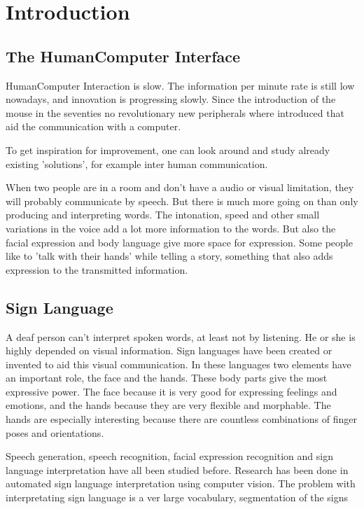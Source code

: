
\chapter{Introduction}
\label{ch:intro}

\section{The Human\-Computer Interface}


Human\-Computer Interaction is slow. The information per minute rate is still low nowadays, and innovation is progressing slowly. Since the introduction of the mouse in the seventies no revolutionary new peripherals where introduced that aid the communication with a computer. 

To get inspiration for improvement, one can look around and study already existing 'solutions', for example inter human communication. 

When two people are in a room and don't have a audio or visual limitation, they will probably communicate by speech. But there is much more going on than only producing and interpreting words. The intonation, speed and other small variations in the voice add a lot more information to the words. But also the facial expression and body language give more space for expression. Some people like to 'talk with their hands' while telling a story, something that also adds expression to the transmitted information.


\section{Sign Language}

A deaf person can't interpret spoken words, at least not by listening. He or she is highly depended on visual information. Sign languages have been created or invented to aid this visual communication. In these languages two elements have an important role, the face and the hands. These body parts give the most expressive power. The face because it is very good for expressing feelings and emotions, and the hands because they are very flexible and morphable. The hands are especially interesting because there are countless combinations of finger poses and orientations. 

Speech generation, speech recognition, facial expression recognition and sign language interpretation have all been studied before. Research has been done in automated sign language interpretation using computer vision\cite{Buehler2009}\cite{RichardBowden2004}. The problem with interpretating sign language is a ver large vocabulary, segmentation of the signs



